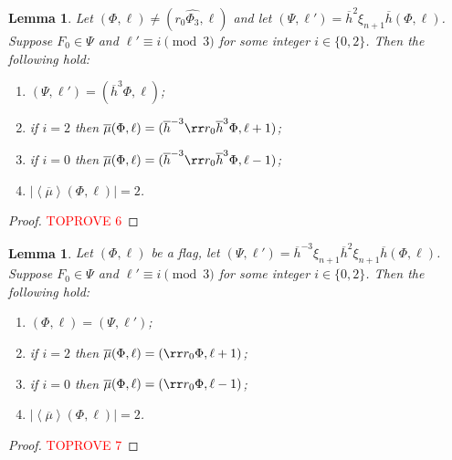 \documentclass[final]{amsart}
\theoremstyle{plain}
\newtheorem{lemma}[thm]{Lemma}
\theoremstyle{definition}
\theoremstyle{remark}
\numberwithin{equation}{section}
\renewcommand{\{}{\lbrace}
\renewcommand{\}}{\rbrace}
\renewcommand{\bar}{\overline}
\renewcommand{\hat}{\widehat}
\newcommand{\kng}{{h}}
\newcommand{\etab}{\bar{\kng}}
\newcommand{\mub}{\bar{\mu}}
\newcommand{\te}{\xi}
\begin{document}
\begin{lemma}\label{lem:chapulines2}
Let $(\Phi,\ell) \neq (r_0 \hat{\Phi_3},\ell)$ and let $(\Psi,\ell') =  \etab^{2} \te_{n+1} \etab (\Phi,\ell)$.
Suppose $F_0 \in \Psi$ and $\ell' \equiv i \pmod 3$ for some integer $i\in \{0,2\}$. 
Then the following hold:
\begin{enumerate}
    \item \label{item:chapulines21} $(\Psi,\ell') = (\etab^{3}\Phi, \ell)$;
\item \label{item:chapulines22} if $i = 2$ then $\mub(\Phi,\ell) = (\etab^{-3} \rr r_0 \etab^3 \Phi,\ell+1)$;
    \item \label{item:chapulines23} if $i = 0$ then $\mub(\Phi,\ell) = (\etab^{-3} \rr r_0 \etab^3 \Phi,\ell-1)$;
    \item \label{item:chapulines24}$ |\left\langle \mub \right\rangle (\Phi,\ell)| = 2$. 
\end{enumerate}




\end{lemma}

\begin{proof}\textcolor{red}{TOPROVE 6}\end{proof}







\begin{lemma}\label{lem:chapulines3}
Let $(\Phi,\ell)$ be a flag, let $(\Psi,\ell') =  \etab^{-3} \te_{n+1} \etab^{2} \te_{n+1} \etab (\Phi,\ell)$. Suppose $F_0 \in \Psi$ and $\ell' \equiv i \pmod 3$ for some integer $i\in \{0,2\}$. Then the following hold:
\begin{enumerate}
    \item \label{item:chapulines31} $(\Phi,\ell) = (\Psi, \ell')$;
    \item \label{item:chapulines32} if $i = 2$ then $\mub(\Phi,\ell) = (\rr r_0 \Phi,\ell+1)$;
    \item \label{item:chapulines33} if $i = 0$ then $\mub(\Phi,\ell) = (\rr r_0 \Phi,\ell-1)$;
    \item \label{item:chapulines34}$|\left\langle \mub \right\rangle (\Phi,\ell)| = 2$.
\end{enumerate}

\end{lemma}

\begin{proof}\textcolor{red}{TOPROVE 7}\end{proof} 
\end{document}
